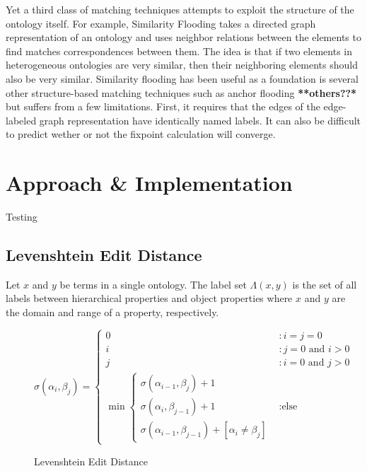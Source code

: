 \documentclass[letterpaper,twocolumn,12pt]{article}
\begin{document}
Yet a third class of matching techniques attempts to exploit the structure of the ontology
itself. For example, Similarity Flooding takes a directed graph representation of an 
ontology and uses neighbor relations between the elements to find matches correspondences
between them. The idea is that if two elements in heterogeneous ontologies are very similar,
then their neighboring elements should also be very similar.
%
Similarity flooding has been useful as a foundation is several other structure-based
matching techniques such as anchor flooding \textbf{**others??*} but suffers from 
a few limitations. First, it requires that the edges of the edge-labeled graph 
representation have identically named labels. It can also be difficult to predict
wether or not the fixpoint calculation will converge.
\newline

\section{Approach \& Implementation}
Testing

\subsection{Levenshtein Edit Distance}

\begin{defn}
Let $x$ and $y$ be terms in a single ontology. The label set $\Lambda \left( x, y \right)$ is the set of all labels between hierarchical properties and object properties where $x$ and $y$ are the domain and range of a property, respectively.
\end{defn}

\begin{figure*}
\centering
\begin{equation*}
\sigma 
\left( \alpha_i, \beta_j \right) = \left\{
	\begin{array}{ll}
   	 	0 &: i=j=0 \\
		i &: j = 0 \text{ and } i > 0 \\
		j &: i = 0 \text{ and } j > 0 \\
		\min 
			\left\{ 
			\begin{array}{l}
				\sigma \left( \alpha_{i-1}, \beta_j \right) + 1 \\
          		\sigma \left( \alpha_i, \beta_{j-1} \right) + 1 \\
          		\sigma \left( \alpha_{i-1}, \beta_{j-1} \right) + [\alpha_i \neq \beta_j]
			\end{array} \right. &: \text{else}
     \end{array}
\right.
\end{equation*}
\caption{Levenshtein Edit Distance}
\end{figure*}
\end{document}
